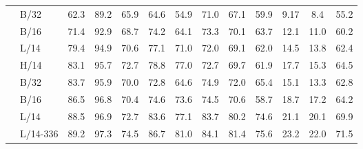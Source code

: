 \documentclass{article} \usepackage{iclr2023_conference,times}
\begin{document}
\begin{table}
{\begin{tabular}{cl|ccccc|ccc|cc|c}
			 & B/32     & 62.3 & 89.2 & 65.9 & 64.6    & 54.9        & 71.0                           & 67.1                       & 59.9    & 9.17    & 8.4    & 55.2 \\
			 & B/16     & 71.4 & 92.9 & 68.7 & 74.2    & 64.1        & 73.3                           & 70.1                       & 63.7    & 12.1    & 11.0   & 60.2 \\
			 & L/14     & 79.4 & 94.9 & 70.6 & 77.1    & 71.0        & 72.0                           & 69.1                       & 62.0    & 14.5    & 13.8   & 62.4 \\
			 & H/14     & 83.1 & 95.7 & 72.7 & 78.8    & 77.0        & 72.7                           & 69.7                       & 61.9    & 17.7    & 15.3   & 64.5 \\ \midrule \multirow{4}{01em}{\rotatebox[origin=c]{90}{Ours}}
			 & B/32     & 83.7 & 95.9 & 70.0 & 72.8    & 64.6        & 74.9                           & 72.0                       & 65.4    & 15.1    & 13.3   & 62.8 \\
			 & B/16     & 86.5 & 96.8 & 70.4 & 74.6    & 73.6        & 74.5                           & 70.6                       & 58.7    & 18.7    & 17.2   & 64.2 \\
			 & L/14     & 88.5 & 96.9 & 72.7 & 83.6    & 77.1        & 83.7                           & 80.2                       & 74.6    & 21.1    & 20.1   & 69.9 \\
			 & L/14-336 & 89.2 & 97.3 & 74.5 & 86.7    & 81.0        & 84.1                           & 81.4                       & 75.6    & 23.2    & 22.0   & 71.5 \\
			\bottomrule
		\end{tabular}
	}
\end{table}
\end{document}
